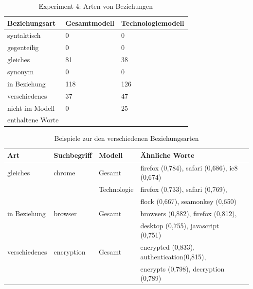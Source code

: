 \documentclass[12pt,a4paper]{report}
\begin{document}
		
		
\begin{table}[H]
\caption{Experiment 4: Arten von Beziehungen}
\label{tab:experiment4}
\begin{center}
\begin{tabular}{|l||l|l|}
\hline
\textbf{Beziehungsart}	& \textbf{Gesamtmodell}	&   \textbf{Technologiemodell}   \\

\hline
 syntaktisch & 0 	& 0 \\
 \hline
 gegenteilig & 0 	& 0  \\
 \hline
 gleiches & 81 	& 38  \\
 \hline
 synonym & 0 	& 0  \\
 \hline
 in Beziehung & 118 	& 126 \\
 \hline
 verschiedenes & 37	& 47 \\
 \hline
 nicht im Modell & 0  & 25  \\
 enthaltene Worte &   &\\
 \hline
 
\end{tabular}
\end{center}
\end{table}
		
		

\begin{table}[H]
\caption{Beispiele zur den verschiedenen Beziehungsarten}
\label{tab:bspBeziehungsarten}
\begin{center}
\begin{tabular}{|l||l|l|l|l|}
\hline
\textbf{Art} & \textbf{Suchbegriff} & \textbf{Modell} & \textbf{Ähnliche Worte}   \\
\hline
 gleiches &chrome	   & Gesamt & firefox (0,784), safari (0,686), ie8 (0,674) \\
   &	   & Technologie & firefox (0,733), safari (0,769),\\
   &&&  flock (0,667), seamonkey (0,650) \\
\hline
 in Beziehung& browser	 & Gesamt & browsers (0,882), firefox (0,812),\\
 &&& desktop (0,755), javascript (0,751)\\
 \hline
verschiedenes& encryption	& Gesamt&  encrypted (0,833),  authentication(0,815),\\
&&&  encrypts (0,798),  decryption (0,789)\\
 	\hline
 
\end{tabular}
\end{center}
\end{table}
\end{document}
